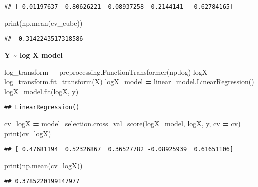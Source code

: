 \documentclass[
]{book}
\newenvironment{Shaded}{\begin{snugshade}}{\end{snugshade}}
\newcommand{\BuiltInTok}[1]{#1}
\newcommand{\NormalTok}[1]{#1}
\newcommand{\OperatorTok}[1]{\textcolor[rgb]{0.81,0.36,0.00}{\textbf{#1}}}
\begin{document}
\begin{verbatim}
## [-0.01197637 -0.80626221  0.08937258 -0.2144141  -0.62784165]
\end{verbatim}

\begin{Shaded}
\begin{Highlighting}[]
\BuiltInTok{print}\NormalTok{(np.mean(cv\_cube))}
\end{Highlighting}
\end{Shaded}

\begin{verbatim}
## -0.3142243517318586
\end{verbatim}

\textbf{Y \textasciitilde{} log X model}

\begin{Shaded}
\begin{Highlighting}[]
\NormalTok{log\_transform }\OperatorTok{=}\NormalTok{ preprocessing.FunctionTransformer(np.log)}
\NormalTok{logX }\OperatorTok{=}\NormalTok{ log\_transform.fit\_transform(X)}
\NormalTok{logX\_model }\OperatorTok{=}\NormalTok{ linear\_model.LinearRegression()}
\NormalTok{logX\_model.fit(logX, y)}
\end{Highlighting}
\end{Shaded}

\begin{verbatim}
## LinearRegression()
\end{verbatim}

\begin{Shaded}
\begin{Highlighting}[]
\NormalTok{cv\_logX }\OperatorTok{=}\NormalTok{ model\_selection.cross\_val\_score(logX\_model, logX, y, cv }\OperatorTok{=}\NormalTok{ cv)}
\BuiltInTok{print}\NormalTok{(cv\_logX)}
\end{Highlighting}
\end{Shaded}

\begin{verbatim}
## [ 0.47681194  0.52326867  0.36527782 -0.08925939  0.61651106]
\end{verbatim}

\begin{Shaded}
\begin{Highlighting}[]
\BuiltInTok{print}\NormalTok{(np.mean(cv\_logX))}
\end{Highlighting}
\end{Shaded}

\begin{verbatim}
## 0.3785220199147977
\end{verbatim}
\end{document}
